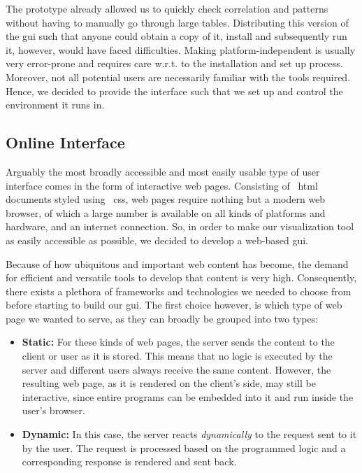 \documentclass[\relativeRoot/main.tex]{subfiles}
\begin{document}
The prototype already allowed us to quickly check correlation and patterns without having to manually go through large tables. Distributing this version of the \gls{gui} such that anyone could obtain a copy of it, install and subsequently run it, however, would have faced difficulties. Making  platform-independent is usually very error-prone and requires care w.r.t. to the installation and set up process. Moreover, not all potential users are necessarily familiar with the tools required. Hence, we decided to provide the interface such that we set up and control the environment it runs in.

\subsection*{Online Interface}
\label{subsec:lyprox:motivation:online}

Arguably the most broadly accessible and most easily usable type of user interface comes in the form of interactive web pages. Consisting of ~\acrshort{html} documents styled using ~\acrshort{css}, web pages require nothing but a modern web browser, of which a large number is available on all kinds of platforms and hardware, and an internet connection. So, in order to make our visualization tool as easily accessible as possible, we decided to develop a web-based \gls{gui}.

Because of how ubiquitous and important web content has become, the demand for efficient and versatile tools to develop that content is very high. Consequently, there exists a plethora of frameworks and technologies we needed to choose from before starting to build our \gls{gui}. The first choice however, is which type of web page we wanted to serve, as they can broadly be grouped into two types:

\begin{itemize}
    \item \textbf{Static:} For these kinds of web pages, the server sends the content to the client or user as it is stored. This means that no logic is executed by the server and different users always receive the same content. However, the resulting web page, as it is rendered on the client's side, may still be interactive, since entire programs can be embedded into it and run inside the user's browser.
    \item \textbf{Dynamic:} In this case, the server reacts \emph{dynamically} to the request sent to it by the user. The request is processed based on the programmed logic and a corresponding response is rendered and sent back.
\end{itemize}
\end{document}
